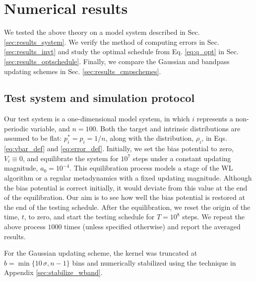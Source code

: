\documentclass[reprint, superscriptaddress, floatfix]{revtex4-1}
\begin{document}
\section{\label{sec:results}
Numerical results}



We tested the above theory on a model system
described in Sec. \ref{sec:results_system}.
%
We verify the method of computing errors
in Sec. \ref{sec:results_invt}
%
and study the optimal schedule from
Eq. \eqref{eq:q_opt}
in Sec. \ref{sec:results_optschedule}.
%
Finally, we compare the Gaussian and
bandpass updating schemes %
in Sec. \ref{sec:results_cmpschemes}.



\subsection{\label{sec:results_system}
Test system and simulation protocol}



Our test system is a one-dimensional model system, in which
$i$ represents a non-periodic variable,
and $n = 100$.
%
Both the target and intrinsic distributions
are assumed to be flat:
$p^*_i = p_i = 1/n$,
along with the distribution, $\rho_i$, in Eqs.
\eqref{eq:vbar_def} and \eqref{eq:error_def}.
%
%
Initially,
we set the bias potential to zero,
$V_i \equiv 0$,
and equilibrate the system for $10^7$ steps
under a constant updating magnitude,
$a_0 = 10^{-4}$.
%
This equilibration process models
a stage of the WL algorithm or
a regular metadynamics
with a fixed updating magnitude.
%
Although the bias potential is correct initially,
it would deviate from this value
at the end of the equilibration.
%
Our aim is to see how well
the bias potential is restored
at the end of the testing schedule.
%
After the equilibration,
we reset the origin of the time, $t$, to zero,
and start the testing schedule
for $T = 10^8$ steps.
%
We repeat the above process $1000$ times (unless specified otherwise)
and report the averaged results.



For the Gaussian updating scheme,
the kernel was truncated at
$b = \min\{10 \, \sigma, n - 1\}$ bins
and numerically stabilized
using the technique
in Appendix \ref{sec:stabilize_wband}.
\end{document}
